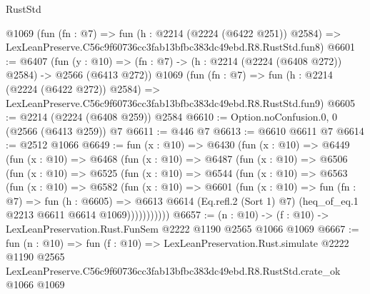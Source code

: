 \begin{lexlean}{RustStd}
\begin{coremodule}
    @1069
    (fun (fn : @7) =>
    fun (h : @2214 (@2224 (@6422 @251)) @2584) =>
    LexLeanPreserve.C56c9f60736cc3fab13bfbc383dc49ebd.R8.RustStd.fun8)
@6601 := @6407
    (fun (y : @10) => (fn : @7) -> (h : @2214 (@2224 (@6408 @272)) @2584) -> @2566 (@6413 @272))
    @1069
    (fun (fn : @7) =>
    fun (h : @2214 (@2224 (@6422 @272)) @2584) =>
    LexLeanPreserve.C56c9f60736cc3fab13bfbc383dc49ebd.R8.RustStd.fun9)
@6605 := @2214 (@2224 (@6408 @259)) @2584
@6610 := Option.noConfusion.{0, 0} (@2566 (@6413 @259)) @7
@6611 := @446 @7
@6613 := @6610 @6611 @7
@6614 := @2512 @1066
@6649 := fun (x : @10) =>
  @6430
    (fun (x : @10) =>
    @6449
      (fun (x : @10) =>
      @6468
        (fun (x : @10) =>
        @6487
          (fun (x : @10) =>
          @6506
            (fun (x : @10) =>
            @6525
              (fun (x : @10) =>
              @6544
                (fun (x : @10) =>
                @6563
                  (fun (x : @10) =>
                  @6582
                    (fun (x : @10) =>
                    @6601
                      (fun (x : @10) =>
                      fun (fn : @7) =>
                      fun (h : @6605) =>
                      @6613
                        @6614
                        (Eq.refl.{2} (Sort 1) @7)
                        (heq_of_eq.{1} @2213 @6611 @6614 @1069)))))))))))
@6657 := (n : @10) -> (f : @10) -> LexLeanPreservation.Rust.FunSem @2222 @1190 @2565 @1066 @1069
@6667 := fun (n : @10) =>
  fun (f : @10) =>
  LexLeanPreservation.Rust.simulate
    @2222
    @1190
    @2565
    LexLeanPreserve.C56c9f60736cc3fab13bfbc383dc49ebd.R8.RustStd.crate_ok
    @1066
    @1069
\end{coremodule}
\end{lexlean}
